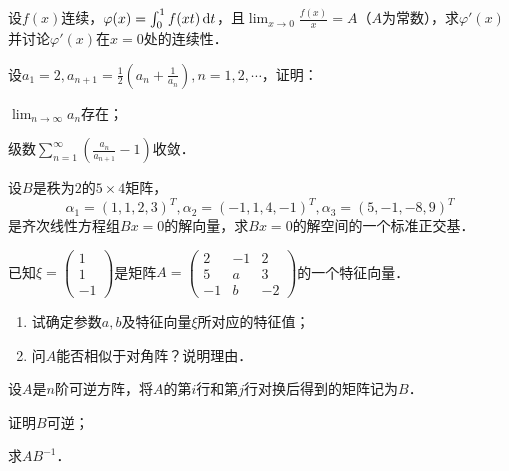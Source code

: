 \documentclass[plain,noanswer,medmath]{../../template/jnuexam}
\begin{document}

\begin{problem}
设$f(x)$连续，$\varphi (x) = \int_0^1f(xt) \mathop{}\!\mathrm{d} t$，且$\lim_{x \to 0} \frac{f(x)}{x} = A$（$A$为常数），求$\varphi'(x)$并讨论$\varphi'(x)$在$x = 0$处的连续性．
\end{problem}



\begin{problem}
设$a_1 = 2,a_{n + 1} = \frac{1}{2}\left(a_n + \frac{1}{a_n} \right),n = 1,2, \cdots$，证明：\par
\begin{enumerate*}
\item $\lim_{n \to \infty} a_n$存在；
\item 级数$\sum_{n = 1}^{\infty}\left(\frac{a_n}{a_{n + 1}} - 1 \right)$收敛．
\end{enumerate*}
\end{problem}




\begin{problem}
设$B$是秩为$2$的$5 \times 4$矩阵，
$$\alpha_1 = (1,1,2,3)^T,\alpha_2 = (- 1,1,4, - 1)^T,\alpha_3 = (5, - 1, - 8,9)^T$$
是齐次线性方程组$Bx = 0$的解向量，求$Bx = 0$的解空间的一个标准正交基．
\end{problem}


\begin{problem}
已知$\xi = \begin{pmatrix}
  1 \\
  1 \\
  -1
\end{pmatrix}$是矩阵$A = \begin{pmatrix}
   2 & -1 & 2 \\
   5 &  a & 3 \\
  -1 &  b & -2
\end{pmatrix}$的一个特征向量．
\begin{enumerate}
\item 试确定参数$a,b$及特征向量$\xi$所对应的特征值；
\item 问$A$能否相似于对角阵？说明理由．
\end{enumerate}
\end{problem}



\begin{problem}
设$A$是$n$阶可逆方阵，将$A$的第$i$行和第$j$行对换后得到的矩阵记为$B$．\par
\begin{enumerate*}
\item 证明$B$可逆；
\item 求$AB^{-1}$．
\end{enumerate*}
\end{problem}
\end{document}
